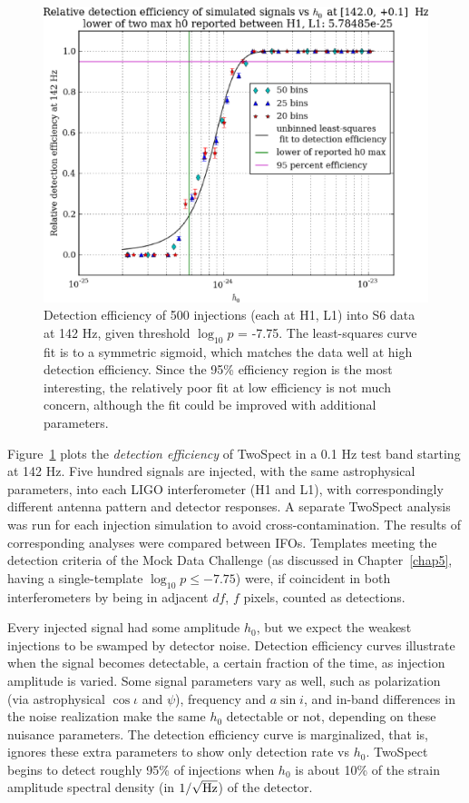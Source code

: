 \begin{figure}
\begin{center}
\includegraphics[width=0.70\paperwidth,height=0.48\paperheight]{plots/detectionEfficiencyh0-142-0Hz.eps}
\caption{Detection efficiency of 500 injections (each at H1, L1) into
S6 data at 142 Hz, given threshold $\log_{10}p$ = -7.75.
The least-squares curve fit is to a symmetric sigmoid, which matches the data well at high detection efficiency.
Since the 95\% efficiency region is the most interesting, the relatively poor fit at low efficiency is not much concern, although the fit could be improved with additional parameters.}
\label{S6_det_eff_142}
\end{center}
\end{figure}

Figure~\ref{S6_det_eff_142} plots the \textit{detection efficiency} of TwoSpect in a 0.1 Hz test band starting at 142 Hz.
Five hundred signals are injected, with the same astrophysical parameters, into each LIGO interferometer (H1 and L1), with correspondingly different antenna pattern and detector responses.
A separate TwoSpect analysis was run for each injection simulation to avoid cross-contamination.
The results of corresponding analyses were compared between IFOs.
Templates meeting the detection criteria of the Mock Data Challenge (as discussed in Chapter~\ref{chap5}, having a single-template $\log_{10} p \leq -7.75$) were, if coincident in both interferometers by being in adjacent $df$, $f$ pixels, counted as detections.

Every injected signal had some amplitude $h_0$, but we expect the weakest injections to be swamped by detector noise.
Detection efficiency curves illustrate when the signal becomes detectable, a certain fraction of the time, as injection amplitude is varied.
Some signal parameters vary as well, such as polarization (via astrophysical $\cos \iota$ and $\psi$), frequency and $a \sin i$, and in-band differences in the noise realization make the same $h_0$ detectable or not, depending on these nuisance parameters.
The detection efficiency curve is marginalized, that is, ignores these extra parameters to show only detection rate vs $h_0$.
TwoSpect begins to detect roughly 95\% of injections when $h_0$ is about 10\% of the strain amplitude spectral density (in $1/\sqrt{\textup{Hz}}$) of the detector.

